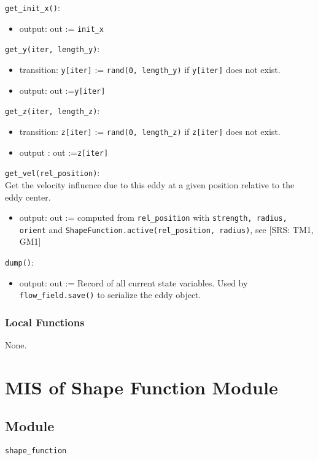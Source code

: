 \documentclass[12pt, titlepage]{article}
\begin{document}
\noindent \texttt{get\_init\_x()}:
\begin{itemize}
  \item output: out := \texttt{init\_x}
\end{itemize}

\noindent \texttt{get\_y(iter, length\_y)}:
\begin{itemize}
  \item transition: \texttt{y[iter]} := \texttt{rand(0, length\_y)} if \texttt{y[iter]} does not exist.
  \item output: out :=\texttt{y[iter]}
\end{itemize}

\noindent \texttt{get\_z(iter, length\_z)}:
\begin{itemize}
  \item transition: \texttt{z[iter]} := \texttt{rand(0, length\_z)} if \texttt{z[iter]} does not exist.
  \item output
  : out :=\texttt{z[iter]}
\end{itemize}
\noindent \texttt{get\_vel(rel\_position)}:\\
Get the velocity influence due to this eddy at a given position relative to the eddy center.
\begin{itemize}
  \item output: out := computed from \texttt{rel\_position} with \texttt{strength, radius, orient} and \texttt{ShapeFunction.active(rel\_position, radius)}, see [SRS: TM1, GM1]
\end{itemize}

\noindent \texttt{dump()}:
\begin{itemize}
\item output: out := Record of all current state variables. Used by \texttt{flow\_field.save()} to serialize the eddy object.
\end{itemize}

\subsubsection{Local Functions}

None.


\newpage
\section{MIS of Shape Function Module} \label{mShape}

\subsection{Module}
\texttt{shape\_function}
\end{document}

